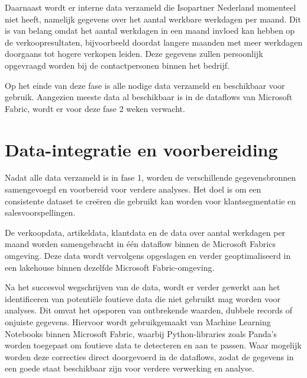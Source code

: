 \vspace{1 em}

Daarnaast wordt er interne data verzameld die Isopartner Nederland momenteel niet heeft, namelijk gegevens over het aantal werkbare werkdagen per maand. Dit is van belang omdat het aantal werkdagen in een maand invloed kan hebben op de verkoopresultaten, bijvoorbeeld doordat langere maanden met meer werkdagen doorgaans tot hogere verkopen leiden. Deze gegevens zullen persoonlijk opgevraagd worden bij de contactpersonen binnen het bedrijf.

\vspace{1 em}

Op het einde van deze fase is alle nodige data verzameld en beschikbaar voor gebruik. Aangezien meeste data al beschikbaar is in de dataflows van Microsoft Fabric, wordt er voor deze fase 2 weken verwacht.

\newpage

\section{Data-integratie en voorbereiding}


Nadat alle data verzameld is in fase 1, worden de verschillende gegevensbronnen samengevoegd en voorbereid voor verdere analyses. Het doel is om een consistente dataset te creëren die gebruikt kan worden voor klantsegmentatie en salesvoorspellingen.

\vspace{1 em}

De verkoopdata, artikeldata, klantdata en de data over aantal werkdagen per maand worden samengebracht in één dataflow binnen de Microsoft Fabrics omgeving. Deze data wordt vervolgens opgeslagen en verder geoptimaliseerd in een lakehouse binnen dezelfde Microsoft Fabric-omgeving.

\vspace{1 em}

Na het succesvol wegschrijven van de data, wordt er verder gewerkt aan het identificeren van potentiële foutieve data die niet gebruikt mag worden voor analyses. Dit omvat het opsporen van ontbrekende waarden, dubbele records of onjuiste gegevens. Hiervoor wordt gebruikgemaakt van Machine Learning Notebooks binnen Microsoft Fabric, waarbij Python-libraries zoals Panda’s worden toegepast om foutieve data te detecteren en aan te passen. Waar mogelijk worden deze correcties direct doorgevoerd in de dataflows, zodat de gegevens in een goede staat beschikbaar zijn voor verdere verwerking en analyse.

